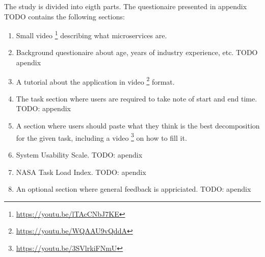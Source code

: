 The study is divided into eigth parts. The questionaire presented in appendix TODO contains the following sections:

\begin{enumerate}[1.]
  \item Small video \footnote{\url{https://youtu.be/lTAcCNbJ7KE}} describing what microservices are.
  \item Background questionaire about age, years of industry experience, etc. TODO apendix
  \item A tutorial about the application in video \footnote{\url{https://youtu.be/WQAAU9vQddA}} format.
  \item The task section where users are required to take note of start and end time. TODO: appendix
  \item A section where users should paste what they think is the best decomposition for the given task, including a video \footnote{\url{https://youtu.be/3SVlrkiFNmU}} on how to fill it.
  \item System Usability Scale. TODO: apendix
  \item NASA Task Load Index. TODO: apendix
  \item An optional section where general feedback is appriciated. TODO: apendix
\end{enumerate}
